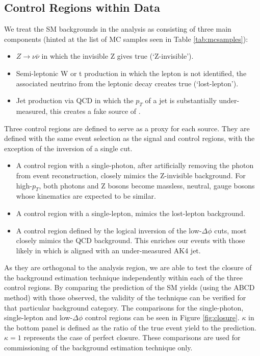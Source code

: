 \subsection{Control Regions within Data}
\label{sec:smbkg}

We treat the SM backgrounds in the analysis as consisting of three main components (hinted at the list of MC samples seen in Table \ref{tab:mcsamples}):

\begin{itemize}
\item $Z\rightarrow\nu\bar{\nu}$ in which the invisible Z gives true \ptmiss (`Z-invisible').
\item Semi-leptonic W or t production in which the lepton is not identified, the associated neutrino from the leptonic decay creates true \ptmiss (`lost-lepton').
\item Jet production via QCD in which the $p_{T}$ of a jet is substantially under-measured, this creates a fake source of \ptmiss.
\end{itemize}

Three control regions are defined to serve as a proxy for each source. They are defined with the same event selection as the signal and control regions, with the exception of the inversion of a single cut.

\begin{itemize}
\item A control region with a single-photon, after artificially removing the photon from event reconstruction, closely mimics the Z-invisible background. For high-$p_{T}$, both photons and Z bosons become massless, neutral, gauge bosons whose kinematics are expected to be similar.
\item A control region with a single-lepton, mimics the lost-lepton background.
\item A control region defined by the logical inversion of the low-$\Delta\phi$ cuts, most closely mimics the QCD background. This enriches our events with those likely in which \ptmiss is aligned with an under-measured AK4 jet.
\end{itemize}

As they are orthogonal to the analysis region, we are able to test the closure of the background estimation technique independently within each of the three control regions. By comparing the prediction of the SM yields (using the ABCD method) with those observed, the validity of the technique can be verified for that particular background category. The comparisons for the single-photon, single-lepton and low-$\Delta\phi$ control regions can be seen in Figure \ref{fig:closure}. $\kappa$ in the bottom panel is defined as the ratio of the true event yield to the prediction. $\kappa=1$ represents the case of perfect closure. These comparisons are used for commissioning of the background estimation technique only.

